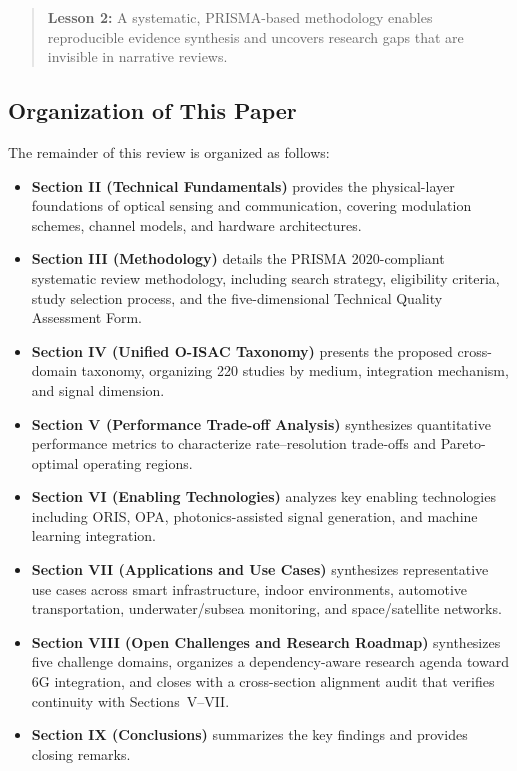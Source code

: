 \begin{quote}
\textbf{Lesson 2:} A systematic, PRISMA-based methodology enables reproducible evidence synthesis and uncovers research gaps that are invisible in narrative reviews.
\end{quote}

\subsection{Organization of This Paper}

The remainder of this review is organized as follows:
\begin{itemize}
\item \textbf{Section II (Technical Fundamentals)} provides the physical-layer foundations of optical sensing and communication, covering modulation schemes, channel models, and hardware architectures.
\item \textbf{Section III (Methodology)} details the PRISMA 2020-compliant systematic review methodology, including search strategy, eligibility criteria, study selection process, and the five-dimensional Technical Quality Assessment Form.
\item \textbf{Section IV (Unified O-ISAC Taxonomy)} presents the proposed cross-domain taxonomy, organizing 220 studies by medium, integration mechanism, and signal dimension.
\item \textbf{Section V (Performance Trade-off Analysis)} synthesizes quantitative performance metrics to characterize rate--resolution trade-offs and Pareto-optimal operating regions.
\item \textbf{Section VI (Enabling Technologies)} analyzes key enabling technologies including ORIS, OPA, photonics-assisted signal generation, and machine learning integration.
\item \textbf{Section VII (Applications and Use Cases)} synthesizes representative use cases across smart infrastructure, indoor environments, automotive transportation, underwater/subsea monitoring, and space/satellite networks.
\item \textbf{Section VIII (Open Challenges and Research Roadmap)} synthesizes five challenge domains, organizes a dependency-aware research agenda toward 6G integration, and closes with a cross-section alignment audit that verifies continuity with Sections~V--VII.
\item \textbf{Section IX (Conclusions)} summarizes the key findings and provides closing remarks.
\end{itemize}


